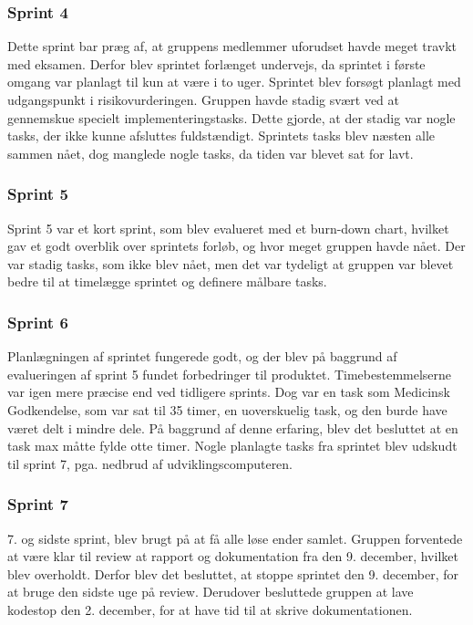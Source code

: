 \subsubsection{Sprint 4} 
Dette sprint bar præg af, at gruppens medlemmer uforudset havde meget travkt med eksamen. Derfor blev sprintet forlænget undervejs, da sprintet i første omgang var planlagt til kun at være i to uger. Sprintet blev forsøgt planlagt med udgangspunkt i risikovurderingen. Gruppen havde stadig svært ved at gennemskue specielt implementeringstasks. Dette gjorde, at der stadig var nogle tasks, der ikke kunne afsluttes fuldstændigt. Sprintets tasks blev næsten alle sammen nået, dog manglede nogle tasks, da tiden var blevet sat for lavt. 

\subsubsection{Sprint 5} 
Sprint 5 var et kort sprint, som blev evalueret med et burn-down chart, hvilket gav et godt overblik over sprintets forløb, og hvor meget gruppen havde nået. Der var stadig tasks, som ikke blev nået, men det var tydeligt at gruppen var blevet bedre til at timelægge sprintet og definere målbare tasks.

\subsubsection{Sprint 6} 
Planlægningen af sprintet fungerede godt, og der blev på baggrund af evalueringen af sprint 5 fundet forbedringer til produktet. Timebestemmelserne var igen mere præcise end ved tidligere sprints. Dog var en task som Medicinsk Godkendelse, som var sat til 35 timer, en uoverskuelig task, og den burde have været delt i mindre dele. På baggrund af denne erfaring, blev det besluttet at en task max måtte fylde otte timer. Nogle planlagte tasks fra sprintet blev udskudt til sprint 7, pga. nedbrud af udviklingscomputeren.   

\subsubsection{Sprint 7} 
7. og sidste sprint, blev brugt på at få alle løse ender samlet. Gruppen forventede at være klar til review at rapport og dokumentation fra den 9. december, hvilket blev overholdt. Derfor blev det besluttet, at stoppe sprintet den 9. december, for at bruge den sidste uge på review. Derudover besluttede gruppen at lave kodestop den 2. december, for at have tid til at skrive dokumentationen. 

